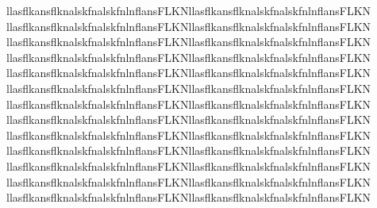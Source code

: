 \documentclass[final]{beamer}
\begin{document}
    llasflkansflknalskfnalskfnlnflansFLKNllasflkansflknalskfnalskfnlnflansFLKN
    llasflkansflknalskfnalskfnlnflansFLKNllasflkansflknalskfnalskfnlnflansFLKN    llasflkansflknalskfnalskfnlnflansFLKNllasflkansflknalskfnalskfnlnflansFLKN
    llasflkansflknalskfnalskfnlnflansFLKNllasflkansflknalskfnalskfnlnflansFLKN
    llasflkansflknalskfnalskfnlnflansFLKNllasflkansflknalskfnalskfnlnflansFLKN
    llasflkansflknalskfnalskfnlnflansFLKNllasflkansflknalskfnalskfnlnflansFLKN
    llasflkansflknalskfnalskfnlnflansFLKNllasflkansflknalskfnalskfnlnflansFLKN
    llasflkansflknalskfnalskfnlnflansFLKNllasflkansflknalskfnalskfnlnflansFLKN
    llasflkansflknalskfnalskfnlnflansFLKNllasflkansflknalskfnalskfnlnflansFLKN
    llasflkansflknalskfnalskfnlnflansFLKNllasflkansflknalskfnalskfnlnflansFLKN
    llasflkansflknalskfnalskfnlnflansFLKNllasflkansflknalskfnalskfnlnflansFLKN
    llasflkansflknalskfnalskfnlnflansFLKNllasflkansflknalskfnalskfnlnflansFLKN
    llasflkansflknalskfnalskfnlnflansFLKNllasflkansflknalskfnalskfnlnflansFLKN
\end{document}
